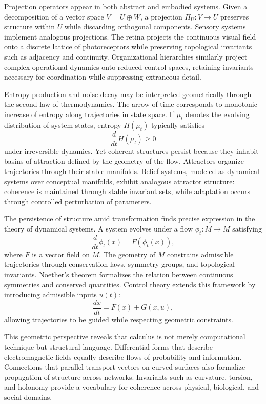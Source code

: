 \documentclass[12pt]{book}
\begin{document}
Projection operators appear in both abstract and embodied systems. Given a decomposition of a vector space $V = U \oplus W$, a projection $\Pi_U : V \to U$ preserves structure within $U$ while discarding orthogonal components. Sensory systems implement analogous projections. The retina projects the continuous visual field onto a discrete lattice of photoreceptors while preserving topological invariants such as adjacency and continuity. Organizational hierarchies similarly project complex operational dynamics onto reduced control spaces, retaining invariants necessary for coordination while suppressing extraneous detail.

Entropy production and noise decay may be interpreted geometrically through the second law of thermodynamics. The arrow of time corresponds to monotonic increase of entropy along trajectories in state space. If $\mu_t$ denotes the evolving distribution of system states, entropy $H(\mu_t)$ typically satisfies
\[
\frac{d}{dt} H(\mu_t) \ge 0
\]
under irreversible dynamics. Yet coherent structures persist because they inhabit basins of attraction defined by the geometry of the flow. Attractors organize trajectories through their stable manifolds. Belief systems, modeled as dynamical systems over conceptual manifolds, exhibit analogous attractor structure: coherence is maintained through stable invariant sets, while adaptation occurs through controlled perturbation of parameters.

The persistence of structure amid transformation finds precise expression in the theory of dynamical systems. A system evolves under a flow $\phi_t : M \to M$ satisfying
\[
\frac{d}{dt} \phi_t(x) = F(\phi_t(x)),
\]
where $F$ is a vector field on $M$. The geometry of $M$ constrains admissible trajectories through conservation laws, symmetry groups, and topological invariants. Noether's theorem formalizes the relation between continuous symmetries and conserved quantities. Control theory extends this framework by introducing admissible inputs $u(t)$:
\[
\frac{dx}{dt} = F(x) + G(x,u),
\]
allowing trajectories to be guided while respecting geometric constraints.

This geometric perspective reveals that calculus is not merely computational technique but structural language. Differential forms that describe electromagnetic fields equally describe flows of probability and information. Connections that parallel transport vectors on curved surfaces also formalize propagation of structure across networks. Invariants such as curvature, torsion, and holonomy provide a vocabulary for coherence across physical, biological, and social domains.
\end{document}
